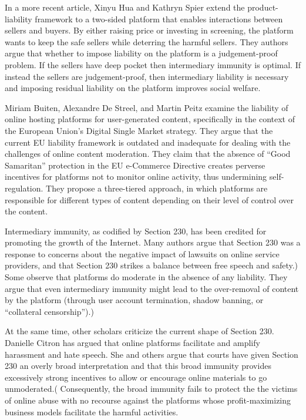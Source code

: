 In a more recent article, Xinyu Hua and Kathryn Spier extend the product-liability framework to a two-sided platform that enables interactions between sellers and buyers. By either raising price or investing in screening, the platform wants to keep the safe sellers while deterring the harmful sellers. They authors argue that whether to impose liability on the platform is a judgement-proof problem. If the sellers have deep pocket then intermediary immunity is optimal. If instead the sellers are judgement-proof, then intermediary liability is necessary and imposing residual liability on the platform improves social welfare.



Miriam Buiten, Alexandre De Streel, and Martin Peitz examine the liability of online hosting platforms for user-generated content, specifically in the context of the European Union's Digital Single Market strategy. They argue that the current EU liability framework is outdated and inadequate for dealing with the challenges of online content moderation. They claim that the absence of ``Good Samaritan'' protection in the EU e-Commerce Directive creates perverse incentives for platforms not to monitor online activity, thus undermining self-regulation. They propose a three-tiered approach, in which platforms are responsible for different types of content depending on their level of control over the content. 

Intermediary immunity, as codified by Section 230, has been credited for promoting the growth of the Internet. Many authors argue that Section 230 was a response to concerns about the negative impact of lawsuits on online service providers, and that Section 230 strikes a balance between free speech and safety.)
Some observe that platforms do moderate in the absence of any liability. They argue that even intermediary immunity might lead to the over-removal of content by the platform (through user account termination, shadow banning, or ``collateral censorship'').)

At the same time, other scholars criticize the current shape of Section 230. Danielle Citron has argued that online platforms facilitate and amplify harassment and hate speech. She and others argue that courts have given Section 230 an overly broad interpretation and that this broad immunity provides excessively strong incentives to allow or encourage online materials to go unmoderated.( Consequently, the broad immunity fails to protect the the victims of online abuse with no recourse against the platforms whose profit-maximizing business models facilitate the harmful activities.


